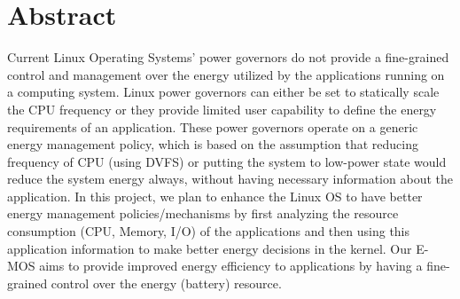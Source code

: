 \section{Abstract}\label{sec:abstract}

	Current Linux Operating Systems' power governors do not provide a fine-grained control and management over the energy utilized by the applications running on a computing system. Linux power governors can either be set to statically scale the CPU frequency or they provide limited user capability to define the energy requirements of an application. These power governors operate on a generic energy management policy, which is based on the assumption that reducing frequency of CPU (using DVFS) or putting the system to low-power state would reduce the system energy always, without having necessary information about the application. In this project, we plan to enhance the Linux OS to have better energy management policies/mechanisms by first analyzing the resource consumption (CPU, Memory, I/O) of the applications and then using this application information to make better energy decisions in the kernel. Our E-MOS aims to provide improved energy efficiency to applications by having a fine-grained control over the energy (battery) resource.

